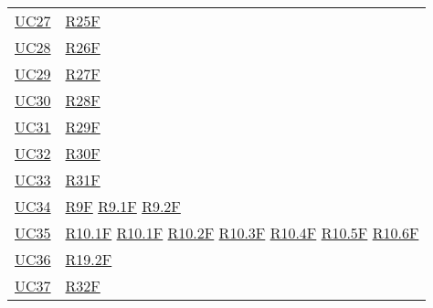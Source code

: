 \begin{center}
\begin{longtable}[!h]{m{50px} m{50px}}
        \hyperref[sec:UC27]{UC27}         & \hyperref[tab:RequisitiFunzionali]{R25F}    \\

        \hyperref[sec:UC28]{UC28}         & \hyperref[tab:RequisitiFunzionali]{R26F}    \\

        \hyperref[sec:UC29]{UC29}         & \hyperref[tab:RequisitiFunzionali]{R27F}    \\

        \hyperref[sec:UC30]{UC30}         & \hyperref[tab:RequisitiFunzionali]{R28F}    \\

        \hyperref[sec:UC31]{UC31}         & \hyperref[tab:RequisitiFunzionali]{R29F}    \\

        \hyperref[sec:UC32]{UC32}         & \hyperref[tab:RequisitiFunzionali]{R30F}    \\

        \hyperref[sec:UC33]{UC33}         & \hyperref[tab:RequisitiFunzionali]{R31F}    \\

        \hyperref[sec:UC34]{UC34}         & \hyperref[tab:RequisitiFunzionali]{R9F}
        \newline \hyperref[tab:RequisitiFunzionali]{R9.1F}
        \newline \hyperref[tab:RequisitiFunzionali]{R9.2F}                              \\

        \hyperref[sec:UC35]{UC35}         & \hyperref[tab:RequisitiFunzionali]{R10.1F}
        \newline \hyperref[tab:RequisitiFunzionali]{R10.1F}
        \newline \hyperref[tab:RequisitiFunzionali]{R10.2F}
        \newline \hyperref[tab:RequisitiFunzionali]{R10.3F}
        \newline \hyperref[tab:RequisitiFunzionali]{R10.4F}
        \newline \hyperref[tab:RequisitiFunzionali]{R10.5F}
        \newline \hyperref[tab:RequisitiFunzionali]{R10.6F}                             \\

        \hyperref[sec:UC36]{UC36}         & \hyperref[tab:RequisitiFunzionali]{R19.2F}  \\
        \hyperref[sec:UC37]{UC37}         & \hyperref[tab:RequisitiFunzionali]{R32F}    \\


\end{longtable}
\end{center}
